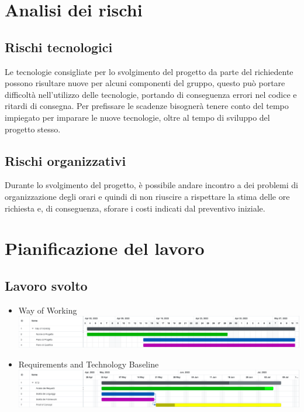 \documentclass[a4paper, 12pt]{article}
\begin{document}
\makeindexdetails
\makefrontpage \makeversioni
\tableofcontents
\newpage
\clearpage
{} 

\section{Analisi dei rischi}

\subsection{Rischi tecnologici}
Le tecnologie consigliate per lo svolgimento del progetto da parte del richiedente possono risultare nuove per alcuni componenti del gruppo, questo può portare difficoltà nell'utilizzo delle tecnologie, portando di conseguenza errori nel codice e ritardi di consegna. \newline
Per prefissare le scadenze bisognerà tenere conto del tempo impiegato per imparare le nuove tecnologie, oltre al tempo di sviluppo del progetto stesso.

\subsection{Rischi organizzativi}
Durante lo svolgimento del progetto, è possibile andare incontro a dei problemi di organizzazione degli orari e quindi di non riuscire a rispettare la stima delle ore richiesta e, di conseguenza, sforare i costi indicati dal preventivo iniziale.
\newpage
\section{Pianificazione del lavoro}

\subsection{Lavoro svolto}



\begin{itemize}
    \item Way of Working\newline
    \includegraphics[scale=0.24]{WoW_2.png}\newline
    \item Requirements and Technology Baseline\newline
    \includegraphics[scale=0.24]{RTB_5.png}\newline
\end{itemize}
\end{document}
